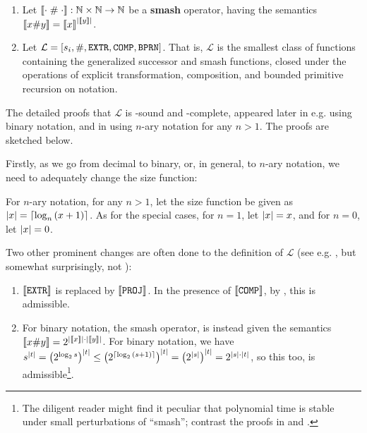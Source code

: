 \begin{definition}
\begin{enumerate}[label=(\arabic*)]
\item Let $\sem{\cdotnot \; \smashf{} \; \cdotnot} : \mathbb{N} \times
\mathbb{N} \rightarrow \mathbb{N}$ be a \textbf{smash} operator, having the
semantics $\sem{x \smashf{} y} = \sem{x}^\card{\sem{y}}$.

\item Let $\mathcal{L} = \seq{s_i, \smashf{}, \mathtt{EXTR}, \mathtt{COMP},
\mathtt{BPRN}}$. That is, $\mathcal{L}$ is the smallest class of functions
containing the generalized successor and smash functions, closed under the
operations of explicit transformation, composition, and bounded primitive
recursion on notation.
 
\end{enumerate}

\end{definition}

The detailed proofs that $\mathcal{L}$ is \FPTIME-sound and \FPTIME-complete,
appeared later in e.g.  \cite{rose-1984,clote-1999} using binary notation, and
in \cite{tourlakis-1984} using $n$-ary notation for any $n>1$.  The proofs are
sketched below. 

Firstly, as we go from decimal to binary, or, in general, to $n$-ary notation,
we need to adequately change the size function:

\begin{definition} For $n$-ary notation, for any $n>1$, let the size function be
given as $\card{x} = \ceil{\log_n\p{x+1}}$. As for the special cases, for
$n=1$, let $\card{x}=x$, and for $n=0$, let $\card{x}=0$.  \end{definition}

Two other prominent changes are often done to the definition of $\mathcal{L}$
(see e.g. \cite{rose-1984, buss-phd-1985-6, bellantoni-cook-1992, clote-1999},
but somewhat surprisingly, not \cite{tourlakis-1984}):

\begin{enumerate}[label=(\arabic*)]

\item $\sem{\mathtt{EXTR}}$ is replaced by $\sem{\mathtt{PROJ}}$. In the
presence of $\sem{\mathtt{COMP}}$, by , this is
admissible.

\item For binary notation, the smash operator, is instead given the semantics
$\sem{x \smashf{} y} = 2^{\card{\sem{x}} \cdot \card{\sem{y}}}$. For binary
notation, we have $s^\card{t} = \p{2^{\log_2{s}}}^\card{t} \leq
\p{2^{\ceil{\log_2\p{s+1}}}}^\card{t} = \p{2^\card{s}}^\card{t} = 2^{\card{s}
\cdot \card{t}}$, so this too, is admissible\footnote{The diligent reader might
find it peculiar that polynomial time is stable under small perturbations of
``smash''; contrast the proofs in \cite{tourlakis-1984} and
\cite{clote-1999}.}.

\end{enumerate}

